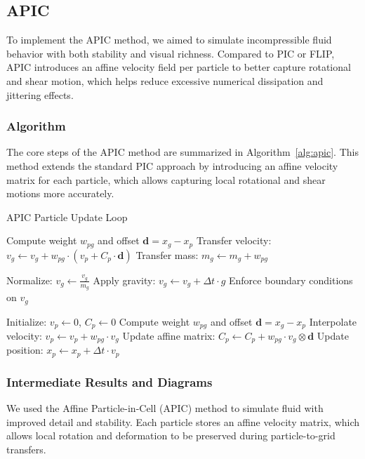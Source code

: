 \subsection{APIC}
To implement the APIC method, we aimed to simulate incompressible fluid behavior with both stability and visual richness. Compared to PIC or FLIP, APIC introduces an affine velocity field per particle to better capture rotational and shear motion, which helps reduce excessive numerical dissipation and jittering effects.

\subsubsection{Algorithm}

The core steps of the APIC method are summarized in Algorithm~\ref{alg:apic}. This method extends the standard PIC approach by introducing an affine velocity matrix for each particle, which allows capturing local rotational and shear motions more accurately.

\begin{algorithm}[h]
\caption{APIC Particle Update Loop}\label{alg:apic}
\begin{algorithmic}[1]

        \State Compute weight $w_{pg}$ and offset $\mathbf{d} = x_g - x_p$
        \State Transfer velocity: $v_g \gets v_g + w_{pg} \cdot (v_p + C_p \cdot \mathbf{d})$
        \State Transfer mass: $m_g \gets m_g + w_{pg}$
    \EndFor
\EndFor

        \State Normalize: $v_g \gets \frac{v_g}{m_g}$
    \EndIf
    \State Apply gravity: $v_g \gets v_g + \Delta t \cdot g$
    \State Enforce boundary conditions on $v_g$
\EndFor

    \State Initialize: $v_p \gets 0$, $C_p \gets 0$
        \State Compute weight $w_{pg}$ and offset $\mathbf{d} = x_g - x_p$
        \State Interpolate velocity: $v_p \gets v_p + w_{pg} \cdot v_g$
        \State Update affine matrix: $C_p \gets C_p + w_{pg} \cdot v_g \otimes \mathbf{d}$
    \EndFor
    \State Update position: $x_p \gets x_p + \Delta t \cdot v_p$
\EndFor
\end{algorithmic}
\end{algorithm}

\subsubsection{Intermediate Results and Diagrams}
We used the Affine Particle-in-Cell (APIC) method to simulate fluid with improved detail and stability. Each particle stores an affine velocity matrix, which allows local rotation and deformation to be preserved during particle-to-grid transfers. 